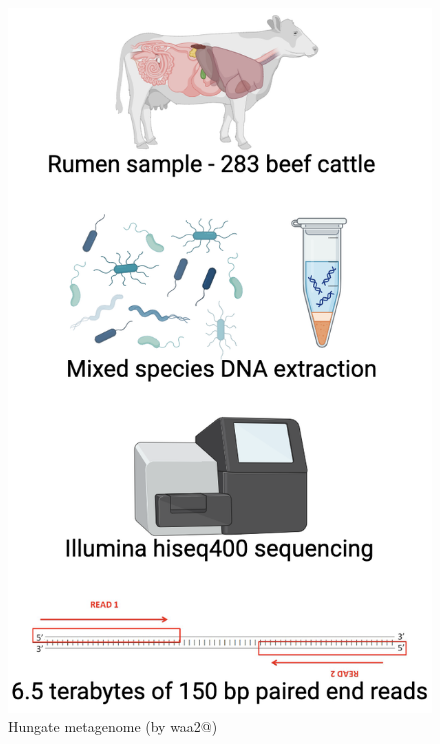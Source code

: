 \documentclass{beamer}
\begin{document}
\begin{frame}[t]
\begin{columns}
		                
		\begin{figure}
			\centering
			\includegraphics[width=\textwidth,height=0.8\textheight,keepaspectratio]{hyngate_workflow.png}
			\caption{Hungate metagenome (by waa2@)}
		\end{figure}
		
		
		                
		                
	\end{columns}
\end{frame}
\end{document}
